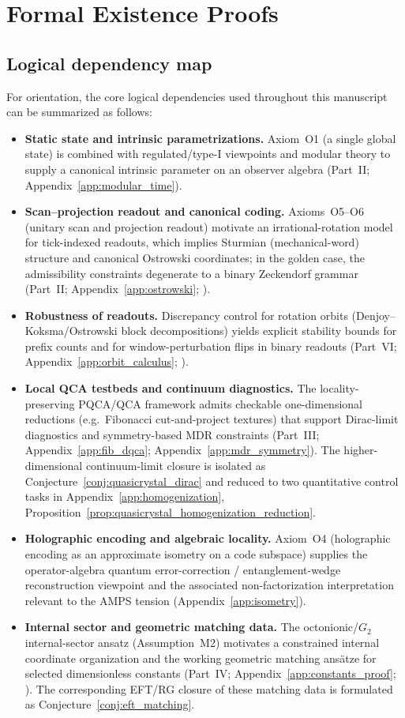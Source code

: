 \section{Formal Existence Proofs}
\label{app:formal_proofs}

\subsection{Logical dependency map}
\label{sec:dependency_map}
For orientation, the core logical dependencies used throughout this manuscript can be summarized as follows:
\begin{itemize}
    \item \textbf{Static state and intrinsic parametrizations.} Axiom~O1 (a single global state) is combined with regulated/type-I viewpoints and modular theory to supply a canonical intrinsic parameter on an observer algebra (Part~II; Appendix~\ref{app:modular_time}).
    \item \textbf{Scan--projection readout and canonical coding.} Axioms~O5--O6 (unitary scan and projection readout) motivate an irrational-rotation model for tick-indexed readouts, which implies Sturmian (mechanical-word) structure and canonical Ostrowski coordinates; in the golden case, the admissibility constraints degenerate to a binary Zeckendorf grammar (Part~II; Appendix~\ref{app:ostrowski}; \cite{Ma2025HPA}).
    \item \textbf{Robustness of readouts.} Discrepancy control for rotation orbits (Denjoy--Koksma/Ostrowski block decompositions) yields explicit stability bounds for prefix counts and for window-perturbation flips in binary readouts (Part~VI; Appendix~\ref{app:orbit_calculus}; \cite{Ma2025HPA}).
    \item \textbf{Local QCA testbeds and continuum diagnostics.} The locality-preserving PQCA/QCA framework admits checkable one-dimensional reductions (e.g.\ Fibonacci cut-and-project textures) that support Dirac-limit diagnostics and symmetry-based MDR constraints (Part~III; Appendix~\ref{app:fib_dqca}; Appendix~\ref{app:mdr_symmetry}). The higher-dimensional continuum-limit closure is isolated as Conjecture~\ref{conj:quasicrystal_dirac} and reduced to two quantitative control tasks in Appendix~\ref{app:homogenization}, Proposition~\ref{prop:quasicrystal_homogenization_reduction}.
    \item \textbf{Holographic encoding and algebraic locality.} Axiom~O4 (holographic encoding as an approximate isometry on a code subspace) supplies the operator-algebra quantum error-correction / entanglement-wedge reconstruction viewpoint and the associated non-factorization interpretation relevant to the AMPS tension (Appendix~\ref{app:isometry}).
    \item \textbf{Internal sector and geometric matching data.} The octonionic/$G_2$ internal-sector ansatz (Assumption~M2) motivates a constrained internal coordinate organization and the working geometric matching ans\"atze for selected dimensionless constants (Part~IV; Appendix~\ref{app:constants_proof}; \cite{Ma2025HPA}). The corresponding EFT/RG closure of these matching data is formulated as Conjecture~\ref{conj:eft_matching}.
\end{itemize}

